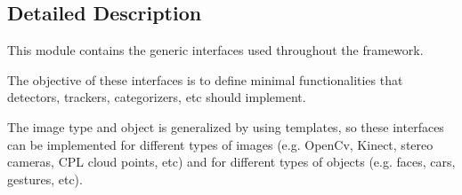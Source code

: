 \subsection{Detailed Description}
This module contains the generic interfaces used throughout the framework. 

The objective of these interfaces is to define minimal functionalities that detectors, trackers, categorizers, etc should implement.

The image type and object is generalized by using templates, so these interfaces can be implemented for different types of images (e.\+g. Open\+Cv, Kinect, stereo cameras, C\+P\+L cloud points, etc) and for different types of objects (e.\+g. faces, cars, gestures, etc). 